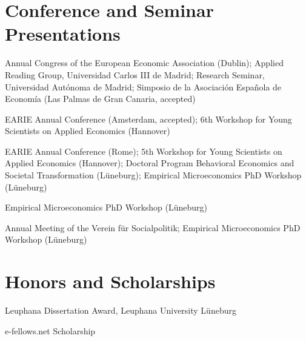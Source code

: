 \documentclass[11pt,a4paper]{article}
\newcommand{\entry}[2]{\item[#1]#2}
\begin{document}
\section{Conference and Seminar Presentations}
\begin{entries}
  \entry{2026}{Annual Congress of the European Economic Association (Dublin);
    Applied Reading Group, Universidad Carlos III de Madrid;
    Research Seminar, Universidad Autónoma de Madrid;
    Simposio de la Asociación Española de Economía (Las Palmas de Gran Canaria, accepted)}
  \entry{2024}{EARIE Annual Conference (Amsterdam, accepted);
    6th Workshop for Young Scientists on Applied Economics (Hannover)}
  \entry{2023}{EARIE Annual Conference (Rome);
    5th Workshop for Young Scientists on Applied Economics (Hannover);
    Doctoral Program Behavioral Economics and Societal Transformation (Lüneburg);
    Empirical Microeconomics PhD Workshop (Lüneburg)}
  \entry{2022}{Empirical Microeconomics PhD Workshop (Lüneburg)}
  \entry{2021}{Annual Meeting of the Verein für Socialpolitik;
    Empirical Microeconomics PhD Workshop (Lüneburg)}
\end{entries}

\section{Honors and Scholarships}
\begin{entries}
  \entry{2025}{Leuphana Dissertation Award, Leuphana University Lüneburg}
  \entry{2017--2024}{e-fellows.net Scholarship}
\end{entries}

\end{document}
